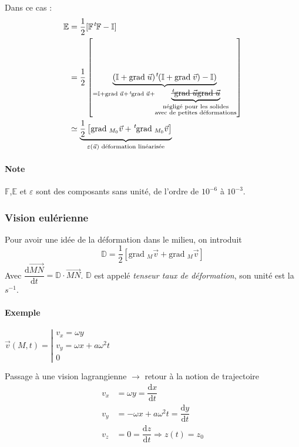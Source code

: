 \documentclass{article}
\newcommand{\deriv}{\mathrm{d}}
\newcommand{\grad}{\mathrm{grad}\;}
\newcommand{\transpose}{\hspace{.1em}{}^t\hspace{-.1em}}
\begin{document}
Dans ce cas :
\begin{align*}
\mathbb{E} & = \dfrac{1}{2}[\mathbb{F}\transpose \mathbb{F} - \mathbb{I}]\\
& = \dfrac{1}{2} \left[ \underbrace{(\mathbb{I} + \grad \vec{u})\transpose(\mathbb{I}+\grad \vec{v}) - \mathbb{I})}_{= \mathbb{I}+ \grad \vec{u} + \transpose \grad \vec{u} + \underbrace{\text{\sout{$\transpose \grad \vec{u}\grad \vec{u}$}}}_{\substack{\text{négligé pour les solides}\\\text{avec de petites déformations}}}} \right]\\
& \simeq \underbrace{\dfrac{1}{2} \left[ \grad_{M_0} \vec{v} + \transpose \grad_{M_0} \vec{v} \right]}_{\varepsilon (\vec{u})\text{ déformation linéarisée}}\\
\end{align*}

\paragraph{Note}
$\mathbb{F}$,$\mathbb{E}$ et $\varepsilon$ sont des composants sans unité, de l'ordre de $10^{-6}$ à $10^{-3}$.

\subsubsection{Vision eulérienne}
Pour avoir une idée de la déformation dans le milieu, on introduit
\[\mathbb{D} = \dfrac{1}{2} \left[ \grad_M \vec{v} + \grad_M \vec{v} \right]\]
Avec $\dfrac{\deriv  \overrightarrow{MN}}{\deriv t} = \mathbb{D} \cdot \overrightarrow{MN}$. $\mathbb{D}$ est appelé \emph{tenseur taux de déformation}, son unité est la $s^{-1}$.


\paragraph{Exemple} $\vec{v}(M,t) = \left\lvert \begin{matrix}
v_x = \omega y\\
v_y = \omega x + a\omega^2 t\\
0
\end{matrix}\right.$


Passage à une vision lagrangienne $\to$ retour à la notion de trajectoire
\begin{align*}
v_x & = \omega y = \dfrac{\deriv x}{\deriv t}\\
v_y & = -\omega x + a\omega^2 t = \dfrac{\deriv y}{\deriv	t}\\
v_z & = 0 = \dfrac{\deriv z}{\deriv t} \Rightarrow z(t) = z_0
\end{align*}
\end{document}
